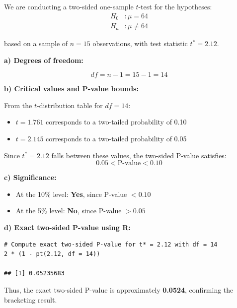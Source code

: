 \begin{example}
We are conducting a two-sided one-sample $t$-test for the hypotheses:
\begin{align*}
H_0 &: \mu = 64 \\
H_a &: \mu \ne 64
\end{align*}

based on a sample of $n = 15$ observations, with test statistic $t^* = 2.12$.

\textbf{a) Degrees of freedom:}

\[
df = n - 1 = 15 - 1 = 14
\]

\textbf{b) Critical values and P-value bounds:}

From the $t$-distribution table for $df = 14$:

\begin{itemize}
  \item $t = 1.761$ corresponds to a two-tailed probability of 0.10
  \item $t = 2.145$ corresponds to a two-tailed probability of 0.05
\end{itemize}

Since $t^* = 2.12$ falls between these values, the two-sided P-value satisfies:
\[
0.05 < \text{P-value} < 0.10
\]

\textbf{c) Significance:}

\begin{itemize}
  \item At the 10\% level: \textbf{Yes}, since P-value $< 0.10$
  \item At the 5\% level: \textbf{No}, since P-value $> 0.05$
\end{itemize}

\textbf{d) Exact two-sided P-value using R:}

\begin{tcolorbox}[colback=gray!10, colframe=black!45, arc=2mm]
\begin{verbatim}
# Compute exact two-sided P-value for t* = 2.12 with df = 14
2 * (1 - pt(2.12, df = 14))

## [1] 0.05235683
\end{verbatim}
\end{tcolorbox}

Thus, the exact two-sided P-value is approximately \textbf{0.0524}, confirming the bracketing result.
\end{example}








